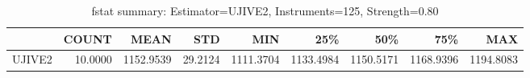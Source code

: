 \begin{table}[ht]
\centering
\caption{fstat summary: Estimator=UJIVE2, Instruments=125, Strength=0.80}
\begin{tabular}{lrrrrrrrr}
\toprule
 & COUNT & MEAN & STD & MIN & 25\% & 50\% & 75\% & MAX \\
\midrule
UJIVE2 & 10.0000 & 1152.9539 & 29.2124 & 1111.3704 & 1133.4984 & 1150.5171 & 1168.9396 & 1194.8083 \\
\bottomrule
\end{tabular}
\end{table}
